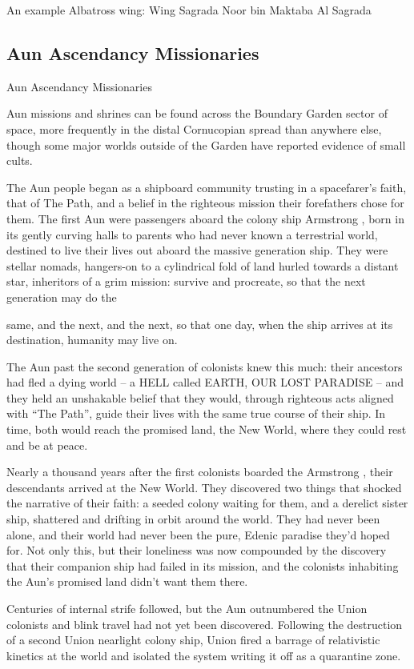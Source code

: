 An example Albatross wing: Wing Sagrada Noor bin Maktaba Al Sagrada

\subsection{Aun Ascendancy Missionaries}
Aun Ascendancy Missionaries

Aun missions and shrines can be found across the Boundary Garden sector of space, more
frequently in the distal Cornucopian spread than anywhere else, though some major worlds
outside of the Garden have reported evidence of small cults.


The Aun people began as a shipboard community trusting in a spacefarer's faith, that of The
Path, and a belief in the righteous mission their forefathers chose for them. The first Aun were
passengers aboard the colony ship Armstrong , born in its gently curving halls to parents who
had never known a terrestrial world, destined to live their lives out aboard the massive generation
ship. They were stellar nomads, hangers-on to a cylindrical fold of land hurled towards a distant
star, inheritors of a grim mission: survive and procreate, so that the next generation may do the




same, and the next, and the next, so that one day, when the ship arrives at its destination,
humanity may live on.


The Aun past the second generation of colonists knew this much: their ancestors had fled a
dying world -- a HELL called EARTH, OUR LOST PARADISE -- and they held an unshakable
belief that they would, through righteous acts aligned with “The Path”, guide their lives with the
same true course of their ship. In time, both would reach the promised land, the New World,
where they could rest and be at peace.


Nearly a thousand years after the first colonists boarded the Armstrong , their descendants
arrived at the New World. They discovered two things that shocked the narrative of their faith: a
seeded colony waiting for them, and a derelict sister ship, shattered and drifting in orbit around
the world. They had never been alone, and their world had never been the pure, Edenic paradise
they’d hoped for. Not only this, but their loneliness was now compounded by the discovery that
their companion ship had failed in its mission, and the colonists inhabiting the Aun’s promised
land didn’t want them there.


Centuries of internal strife followed, but the Aun outnumbered the Union colonists and blink
travel had not yet been discovered. Following the destruction of a second Union nearlight colony
ship, Union fired a barrage of relativistic kinetics at the world and isolated the system writing it
off as a quarantine zone.


